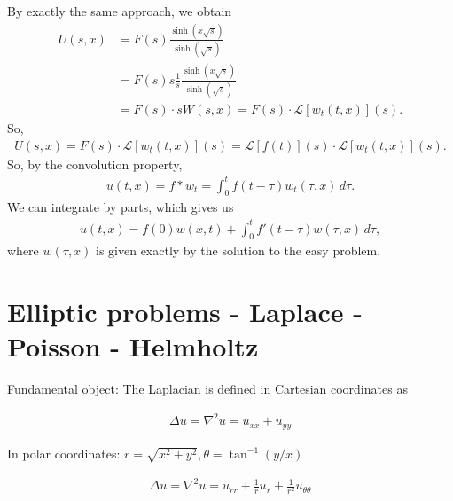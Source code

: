 \documentclass{article}
\theoremstyle{definition}
\newcommand{\lag}{\mathcal{L}}
\newcommand{\f}[2]{\frac{#1}{#2}}
\begin{document}
By exactly the same approach, we obtain
\begin{align*}
U(s,x) &= F(s)\f{\sinh(x\sqrt{s})}{\sinh(\sqrt{s})}\\
 &= F(s)s\f{1}{s}\f{\sinh(x\sqrt{s})}{\sinh(\sqrt{s})}\\
 &= F(s)\cdot sW(s,x) = F(s)\cdot \lag[w_t(t,x)](s).
\end{align*}
So,
\begin{align*}
U(s,x) = F(s) \cdot \lag[w_t(t,x)](s) = \lag[f(t)](s) \cdot \lag[w_t(t,x)](s).
\end{align*}
So, by the convolution property,
\begin{align*}
u(t,x) = f\ast w_t = \int^t_0 f(t-\tau)w_t(\tau,x)\,d\tau.
\end{align*}
We can integrate by parts, which gives us
\begin{align*}
u(t,x) = f(0)w(x,t) + \int^t_0 f'(t-\tau)w(\tau,x)\,d\tau,
\end{align*}
where $w(\tau,x)$ is given exactly by the solution to the easy problem.









\newpage





\section{Elliptic problems - Laplace - Poisson - Helmholtz}

Fundamental object: The Laplacian is defined in Cartesian coordinates as

\begin{align*}
\boxed{\Delta u = \nabla^2 u = u_{xx} + u_{yy}}
\end{align*}

In polar coordinates: $r = \sqrt{x^2 + y^2}, \theta = \tan^{-1}(y/x)$

\begin{align*}
\boxed{\Delta u = \nabla^2 u = u_{rr} + \f{1}{r}u_r + \f{1}{r^2}u_{\theta\theta}}
\end{align*}
\end{document}
